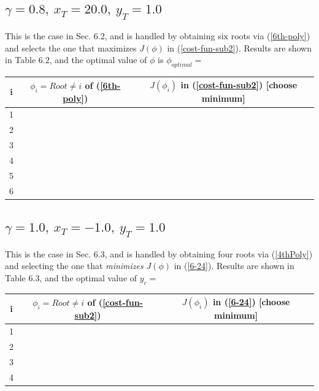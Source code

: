 \subsection{$\gamma=0.8,\ x_T=20.0,\ y_T=1.0$}
This is the case in Sec. 6.2, and is handled by obtaining six roots via (\ref{6th-poly}) and selects the one that maximizes $J(\phi)$ in (\ref{cost-fun-sub2}). Results are shown in Table 6.2, and the optimal value of $\phi$ is $\phi_{optimal}=$


\begin{center}
\begin{tabular}{ |c||c|c| } 
\hline
i & $\phi_i = Root\neq i$ of (\ref{6th-poly}) & $J(\phi_i)$ in (\ref{cost-fun-sub2}) [choose minimum]  \\
 \hline
 \hline
 1 &  &  \\
 \hline 
 2 &  &  \\
 \hline 
 3 &  &  \\ 
 \hline
 4 &  &  \\ 
  \hline
 5 &  &  \\
  \hline
 6 &  &  \\
  \hline
\end{tabular}
\end{center}


\subsection{$\gamma=1.0,\ x_T=-1.0,\ y_T=1.0$}
This is the case in Sec. 6.3, and is handled by obtaining four roots via (\ref{4thPoly}) and selecting the one that \textit{minimizes} $J(\phi)$ in (\ref{6-24}). Results are shown in Table 6.3, and the optimal value of $y_c=$

\begin{center}
\begin{tabular}{ |c||c|c| } 
\hline
i & $\phi_i = Root\neq i$ of (\ref{cost-fun-sub2}) & $J(\phi_i)$ in (\ref{6-24}) [choose minimum]  \\
 \hline
 \hline
 1 &  &  \\
 \hline 
 2 &  &  \\
 \hline 
 3 &  &  \\ 
 \hline
 4 &  &  \\ 
  \hline
\end{tabular}
\end{center}

